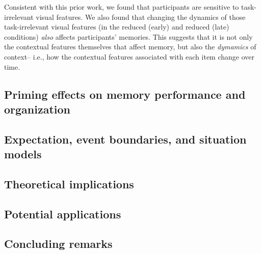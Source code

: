 \documentclass[11pt]{article}
\begin{document}
Consistent with this prior work, we found that participants are sensitive to
task-irrelevant visual features. We also found that changing the dynamics of
those task-irrelevant visual features (in the reduced (early) and reduced
(late) conditions) \textit{also} affects participants' memories. This suggests
that it is not only the contextual features themselves that affect memory, but
also the \textit{dymamics} of context-- i.e., how the contextual features
associated with each item change over time.

\subsection*{Priming effects on memory performance and organization}



\subsection*{Expectation, event boundaries, and situation models}


\subsection*{Theoretical implications}

\subsection*{Potential applications}


\subsection*{Concluding remarks}



\end{document}
